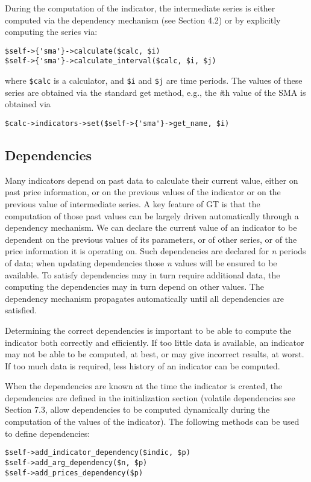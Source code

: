 \documentclass[11pt,twoside]{article}
\begin{document}
During the computation of the indicator, the intermediate series is
either computed via the dependency mechanism (see Section 4.2) or by
explicitly computing the series via:

\begin{lstlisting}[numbers=none]
$self->{'sma'}->calculate($calc, $i)
$self->{'sma'}->calculate_interval($calc, $i, $j)
\end{lstlisting}
where \lstinline!$calc! is a calculator, and
\lstinline!$i! and \lstinline!$j! are time periods.
The values of these series are obtained via the standard get method,
e.g., the \textit{i}th value of the SMA is obtained via
\begin{lstlisting}[numbers=none]
$calc->indicators->set($self->{'sma'}->get_name, $i)
\end{lstlisting}

\subsection[Dependencies]{\label{bkm:Ref192502803}Dependencies}
Many indicators depend on past data to calculate their current value,
either on past price information, or on the previous values of the
indicator or on the previous value of intermediate series. A key
feature of GT is that the computation of those past values can be
largely driven automatically through a dependency mechanism. We can
declare the current value of an indicator to be dependent on the
previous values of its parameters, or of other series, or of the price
information it is operating on. Such dependencies are declared for
\textit{n} periods of data; when updating dependencies those \textit{n}
values will be ensured to be available. To satisfy dependencies may in
turn require additional data, the computing the dependencies may in
turn depend on other values. The dependency mechanism propagates
automatically until all dependencies are satisfied. 

Determining the correct dependencies is important to be able to compute
the indicator both correctly and efficiently. If too little data is
available, an indicator may not be able to be computed, at best, or may
give incorrect results, at worst. If too much data is required, less
history of an indicator can be computed.

When the dependencies are known at the time the indicator is created,
the dependencies are defined in the initialization section (volatile
dependencies see Section 7.3, allow dependencies to be computed
dynamically during the computation of the values of the indicator). The
following methods can be used to define dependencies:
\begin{lstlisting}[numbers=none]
$self->add_indicator_dependency($indic, $p)
$self->add_arg_dependency($n, $p)
$self->add_prices_dependency($p)
\end{lstlisting}
\end{document}
